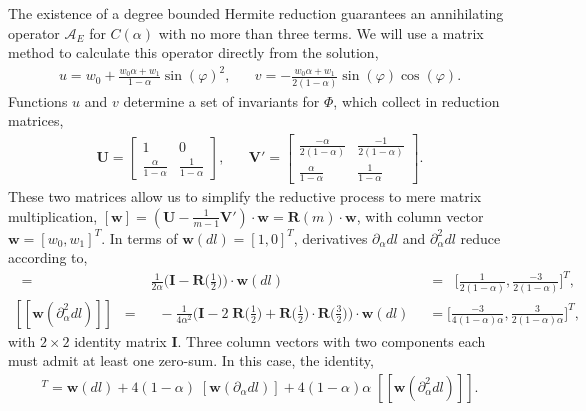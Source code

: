 \documentclass[nofootinbib,preprint]{revtex4-1}
\begin{document}
The existence of a degree bounded Hermite reduction guarantees an annihilating
operator $\mathcal{A}_{E}$ for $C(\alpha)$ with no more than three terms. We
will use a matrix method to calculate this operator directly from the solution,
\begin{eqnarray}
u = w_0 + \frac{w_0\alpha + w_1}{1-\alpha}\sin(\varphi)^2, \;\;\;\;\;\; 
v = -\frac{w_0\alpha + w_1}{2(1-\alpha)}\sin(\varphi)\cos(\varphi).  \nonumber 
\end{eqnarray}
Functions $u$ and $v$ determine a set of invariants for $\Phi$, which collect 
in reduction matrices,
\begin{eqnarray}
\mathbf{U} = \begin{bmatrix} 1 & 0  \\ \frac{\alpha}{1-\alpha} & \frac{1}{1-\alpha} \end{bmatrix}, \;\;\;\;\;\; 
\mathbf{V'} = \begin{bmatrix} \frac{-\alpha}{2(1-\alpha)} & \frac{-1}{2(1-\alpha)}  \\ \frac{\alpha}{1-\alpha} & \frac{1}{1-\alpha} \end{bmatrix}.  \nonumber
\end{eqnarray}
These two matrices allow us to simplify the reductive process to 
mere matrix multiplication, 
$[\mathbf{w}] = (\mathbf{U}-\frac{1}{m-1}\mathbf{V'})\cdot \mathbf{w}= \mathbf{R}(m) \cdot \mathbf{w}$,
with column vector $\mathbf{w}=[w_0,w_1]^T$. In terms of $\mathbf{w}(dl) = [1,0]^T$, 
derivatives $\partial_{\alpha}dl$ and $\partial_{\alpha}^2 dl$ reduce according to,
\begin{eqnarray}
[\mathbf{w}(\partial_{\alpha}dl)] \;\;
=& \frac{1}{2\alpha}\Big(\mathbf{I}-\mathbf{R}\big(\tfrac{1}{2}\big)\Big) \cdot \mathbf{w}(dl) 
&= \;\; \bigg[\frac{1}{2(1-\alpha)},\frac{-3}{2(1-\alpha)}\bigg]^T, \nonumber \\
{[[ \mathbf{w}(\partial_{\alpha}^2dl) ]]} \;\;
=& \;\; -\frac{1}{4\alpha^2}\Big(\mathbf{I}-2\;\mathbf{R}\big(\tfrac{1}{2}\big)
 + \mathbf{R}\big(\tfrac{1}{2}\big)\cdot  \mathbf{R}\big(\tfrac{3}{2}\big) \Big) \cdot \mathbf{w}(dl) \;\; 
&= \bigg[\frac{-3}{4(1-\alpha)\alpha},\frac{3}{2(1-\alpha)\alpha}\bigg]^T, \nonumber 
\end{eqnarray} 
with $2\times2$ identity matrix $\mathbf{I}$. Three column vectors with 
two components each must admit at least one zero-sum. In this case,
the identity,
\begin{eqnarray}
[0,0]^T = \mathbf{w}(dl) + 4(1-\alpha)\;[\mathbf{w}(\partial_{\alpha}dl)]
+ 4(1-\alpha)\alpha\;[[\mathbf{w}(\partial_{\alpha}^2dl)]]. \nonumber
\end{eqnarray}
\end{document}

